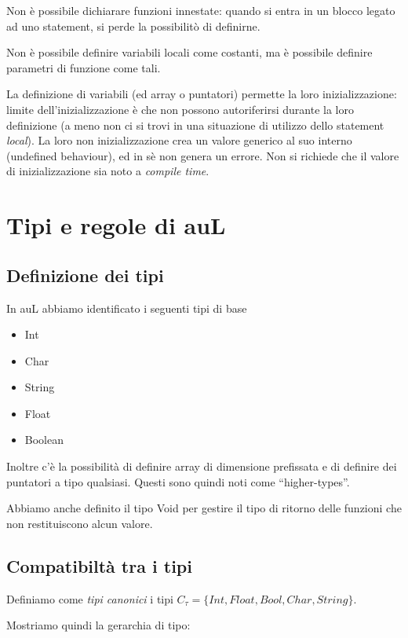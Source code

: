 \documentclass{article}
\begin{document}
Non è possibile dichiarare funzioni innestate: quando si entra in un blocco legato ad uno statement, si perde
la possibilitò di definirne.

Non è possibile definire variabili locali come costanti, ma è possibile definire parametri di funzione
come tali. 

La definizione di variabili (ed array o puntatori) permette la loro inizializzazione: limite dell'inizializzazione è
che non possono autoriferirsi durante la loro definizione (a meno non ci si trovi in una situazione di utilizzo dello
statement \textit{local}). La loro non inizializzazione crea un valore generico al suo interno (undefined behaviour),
ed in sè non genera un errore. Non si richiede che il valore di inizializzazione sia noto a \textit{compile time}.

\section{Tipi e regole di auL}
\subsection{Definizione dei tipi}
In auL abbiamo identificato i seguenti tipi di base
\begin{itemize}
    \item Int
    \item Char
    \item String
    \item Float
    \item Boolean
\end{itemize}
Inoltre c'è la possibilità di definire array di dimensione prefissata e di definire dei puntatori a tipo qualsiasi. Questi sono quindi noti come
``higher-types''.

Abbiamo anche definito il tipo Void per gestire il tipo di ritorno delle funzioni che non restituiscono alcun valore.
\subsection{Compatibiltà tra i tipi}
Definiamo come \emph{tipi canonici} i tipi $C_\tau=\{Int, Float, Bool, Char, String\}$.


Mostriamo quindi la gerarchia di tipo:\\
~\\
~\\
\end{document}

